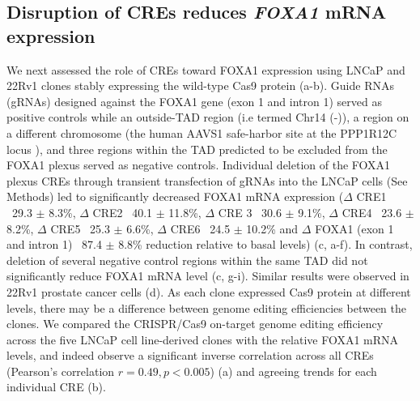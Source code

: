
\subsection{Disruption of CREs reduces \emph{FOXA1} mRNA expression}

We next assessed the role of CREs toward FOXA1 expression using LNCaP and 22Rv1 clones stably expressing the wild-type Cas9 protein (a-b).
Guide RNAs (gRNAs) designed against the FOXA1 gene (exon 1 and intron 1) served as positive controls while an outside-TAD region (i.e termed Chr14 (-)), a region on a different chromosome (the human AAVS1 safe-harbor site at the PPP1R12C locus \cite{kronTMPRSS2ERGFusion2017,dekelverFunctionalGenomicsProteomics2010}), and three regions within the TAD predicted to be excluded from the FOXA1 plexus served as negative controls.
Individual deletion of the FOXA1 plexus CREs through transient transfection of gRNAs into the LNCaP cells (See Methods) led to significantly decreased FOXA1 mRNA expression ($\Delta$ CRE1 ~29.3 $\pm$ 8.3\%, $\Delta$ CRE2 ~40.1 $\pm$ 11.8\%, $\Delta$ CRE 3 ~30.6 $\pm$ 9.1\%, $\Delta$ CRE4 ~23.6 $\pm$ 8.2\%, $\Delta$ CRE5 ~25.3 $\pm$ 6.6\%, $\Delta$ CRE6 ~24.5 $\pm$ 10.2\% and $\Delta$ FOXA1 (exon 1 and intron 1) ~87.4 $\pm$ 8.8\% reduction relative to basal levels) (c, a-f).
In contrast, deletion of several negative control regions within the same TAD did not significantly reduce FOXA1 mRNA level (c, g-i).
Similar results were observed in 22Rv1 prostate cancer cells (d).
As each clone expressed Cas9 protein at different levels, there may be a difference between genome editing efficiencies between the clones.
We compared the CRISPR/Cas9 on-target genome editing efficiency across the five LNCaP cell line-derived clones with the relative FOXA1 mRNA levels, and indeed observe a significant inverse correlation across all CREs (Pearson’s correlation $r = 0.49, p < 0.005$) (a) and agreeing trends for each individual CRE (b).

